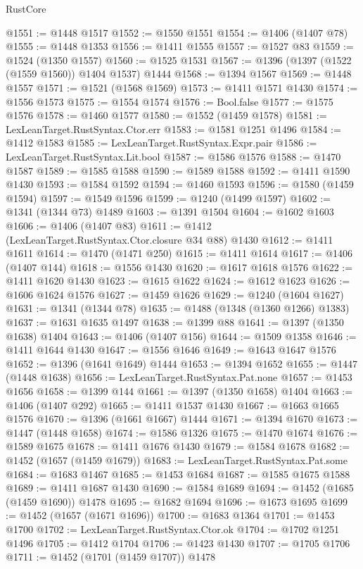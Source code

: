 \begin{lexlean}{RustCore}
\begin{coremodule}
{\begin{coremodule}
{{{{{{{{{{{{{{{{{{{{{{{{{{{{{{{{{{{{{{{{{{{{{@1551 := @1448 @1517
@1552 := @1550 @1551
@1554 := @1406 (@1407 @78)
@1555 := @1448 @1353
@1556 := @1411 @1555
@1557 := @1527 @83
@1559 := @1524 (@1350 @1557)
@1560 := @1525 @1531
@1567 := @1396 (@1397 (@1522 (@1559 @1560)) @1404 @1537) @1444
@1568 := @1394 @1567
@1569 := @1448 @1557
@1571 := @1521 (@1568 @1569)
@1573 := @1411 @1571 @1430
@1574 := @1556 @1573
@1575 := @1554 @1574
@1576 := Bool.false
@1577 := @1575 @1576
@1578 := @1460 @1577
@1580 := @1552 (@1459 @1578)
@1581 := LexLeanTarget.RustSyntax.Ctor.err
@1583 := @1581 @1251 @1496
@1584 := @1412 @1583
@1585 := LexLeanTarget.RustSyntax.Expr.pair
@1586 := LexLeanTarget.RustSyntax.Lit.bool
@1587 := @1586 @1576
@1588 := @1470 @1587
@1589 := @1585 @1588
@1590 := @1589 @1588
@1592 := @1411 @1590 @1430
@1593 := @1584 @1592
@1594 := @1460 @1593
@1596 := @1580 (@1459 @1594)
@1597 := @1549 @1596
@1599 := @1240 (@1499 @1597)
@1602 := @1341 (@1344 @73) @1489
@1603 := @1391 @1504
@1604 := @1602 @1603
@1606 := @1406 (@1407 @83)
@1611 := @1412 (LexLeanTarget.RustSyntax.Ctor.closure @34 @88) @1430
@1612 := @1411 @1611
@1614 := @1470 (@1471 @250)
@1615 := @1411 @1614
@1617 := @1406 (@1407 @144)
@1618 := @1556 @1430
@1620 := @1617 @1618 @1576
@1622 := @1411 @1620 @1430
@1623 := @1615 @1622
@1624 := @1612 @1623
@1626 := @1606 @1624 @1576
@1627 := @1459 @1626
@1629 := @1240 (@1604 @1627)
@1631 := @1341 (@1344 @78)
@1635 := @1488 (@1348 (@1360 @1266) @1383)
@1637 := @1631 @1635 @1497
@1638 := @1399 @88
@1641 := @1397 (@1350 @1638) @1404
@1643 := @1406 (@1407 @156)
@1644 := @1509 @1358
@1646 := @1411 @1644 @1430
@1647 := @1556 @1646
@1649 := @1643 @1647 @1576
@1652 := @1396 (@1641 @1649) @1444
@1653 := @1394 @1652
@1655 := @1447 (@1448 @1638)
@1656 := LexLeanTarget.RustSyntax.Pat.none
@1657 := @1453 @1656
@1658 := @1399 @144
@1661 := @1397 (@1350 @1658) @1404
@1663 := @1406 (@1407 @292)
@1665 := @1411 @1537 @1430
@1667 := @1663 @1665 @1576
@1670 := @1396 (@1661 @1667) @1444
@1671 := @1394 @1670
@1673 := @1447 (@1448 @1658)
@1674 := @1586 @1326
@1675 := @1470 @1674
@1676 := @1589 @1675
@1678 := @1411 @1676 @1430
@1679 := @1584 @1678
@1682 := @1452 (@1657 (@1459 @1679))
@1683 := LexLeanTarget.RustSyntax.Pat.some
@1684 := @1683 @1467
@1685 := @1453 @1684
@1687 := @1585 @1675 @1588
@1689 := @1411 @1687 @1430
@1690 := @1584 @1689
@1694 := @1452 (@1685 (@1459 @1690)) @1478
@1695 := @1682 @1694
@1696 := @1673 @1695
@1699 := @1452 (@1657 (@1671 @1696))
@1700 := @1683 @1364
@1701 := @1453 @1700
@1702 := LexLeanTarget.RustSyntax.Ctor.ok
@1704 := @1702 @1251 @1496
@1705 := @1412 @1704
@1706 := @1423 @1430
@1707 := @1705 @1706
@1711 := @1452 (@1701 (@1459 @1707)) @1478
}}}}}}}}}}}}}}}}}}}}}}}}}}}}}}}}}}}}}}}}}}}}}
\end{coremodule}}
\end{coremodule}
\end{lexlean}

